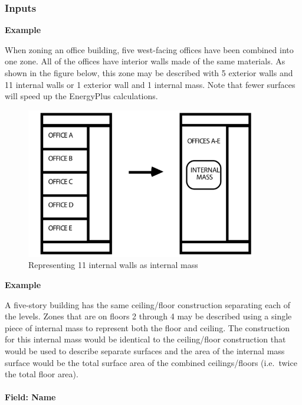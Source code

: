 \subsubsection{Inputs}\label{inputs-25-004}

\textbf{Example}

When zoning an office building, five west-facing offices have been combined into one zone. All of the offices have interior walls made of the same materials. As shown in the figure below, this zone may be described with 5 exterior walls and 11 internal walls or 1 exterior wall and 1 internal mass. Note that fewer surfaces will speed up the EnergyPlus calculations.

\begin{figure}[hbtp] %
\centering
\includegraphics[width=0.9\textwidth, height=0.9\textheight, keepaspectratio=true]{media/image056.png}
\caption{Representing 11 internal walls as internal mass \protect \label{fig:representing-11-internal-walls-as-internal}}
\end{figure}

\textbf{Example}

A five-story building has the same ceiling/floor construction separating each of the levels. Zones that are on floors 2 through 4 may be described using a single piece of internal mass to represent both the floor and ceiling. The construction for this internal mass would be identical to the ceiling/floor construction that would be used to describe separate surfaces and the area of the internal mass surface would be the total surface area of the combined ceilings/floors (i.e.~twice the total floor area).

\paragraph{Field: Name}\label{field-name-21-004}

